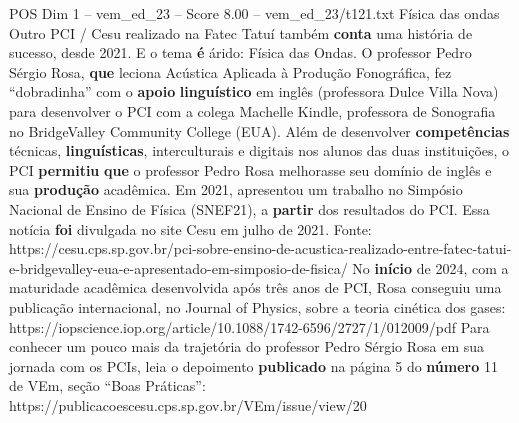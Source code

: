 \begin{textsample}{POS Dim 1 – vem\_ed\_23 – Score 8.00 – vem\_ed\_23/t121.txt}  \label{ex:f1_pos_142}
Física das ondas Outro PCI / Cesu realizado na Fatec Tatuí também \textbf{conta} uma história de sucesso, desde 2021.
E o tema \textbf{é} árido: Física das Ondas.
O professor Pedro Sérgio Rosa, \textbf{que} leciona Acústica Aplicada à Produção Fonográfica, fez “dobradinha” com o \textbf{apoio} \textbf{linguístico} em inglês (professora Dulce Villa Nova) para desenvolver o PCI com a colega Machelle Kindle, professora de Sonografia no BridgeValley Community College (EUA).
Além de desenvolver \textbf{competências} técnicas, \textbf{linguísticas}, interculturais e digitais nos alunos das duas instituições, o PCI \textbf{permitiu} \textbf{que} o professor Pedro Rosa melhorasse seu domínio de inglês e sua \textbf{produção} acadêmica.
Em 2021, apresentou um trabalho no Simpósio Nacional de Ensino de Física (SNEF21), a \textbf{partir} dos resultados do PCI.
Essa notícia \textbf{foi} divulgada no site Cesu em julho de 2021.
Fonte: https://cesu.cps.sp.gov.br/pci-sobre-ensino-de-acustica-realizado-entre-fatec-tatui-e-bridgevalley-eua-e-apresentado-em-simposio-de-fisica/ No \textbf{início} de 2024, com a maturidade acadêmica desenvolvida após três anos de PCI, Rosa conseguiu uma publicação internacional, no Journal of Physics, sobre a teoria cinética dos gases: https://iopscience.iop.org/article/10.1088/1742-6596/2727/1/012009/pdf Para conhecer um pouco mais da trajetória do professor Pedro Sérgio Rosa em sua jornada com os PCIs, leia o depoimento \textbf{publicado} na página 5 do \textbf{número} 11 de VEm, seção “Boas Práticas”: https://publicacoescesu.cps.sp.gov.br/VEm/issue/view/20

\end{textsample}
